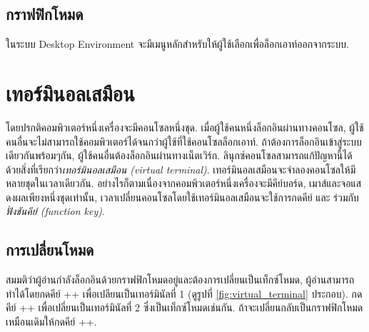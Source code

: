 \begin{thwbr}
\subsection{กราฟฟิกโหมด}
ในระบบ Desktop Environment จะมีเมนูหลักสำหรับให้ผู้ใช้เลือกเพื่อล็อกเอาท์ออกจากระบบ.


\section{เทอร์มินอลเสมือน}
โดยปรกติคอมพิวเตอร์หนึ่งเครื่องจะมีคอนโซลหนึ่งชุด. เมื่อผู้ใช้คนหนึ่งล็อกอินผ่านทางคอนโซล, ผู้ใช้คนอื่นจะไม่สามารถใช้คอมพิวเตอร์ได้จนกว่าผู้ใช้ที่ใช้คอนโซลล็อกเอาท์. ถ้าต้องการล็อกอินเข้าสู่ระบบเดียวกันพร้อมๆกัน, ผู้ใช้คนอื่นต้องล็อกอินผ่านทางเน็ตเวิร์ก. ลินุกซ์คอนโซลสามารถแก้ปัญหานี้ได้ด้วยสิ่งที่เรียกว่า\emph{เทอร์มินอลเสมือน (virtual terminal)}. %
%
เทอร์มินอลเสมือนจะจำลองคอนโซลให้มีหลายชุดในเวลาเดียวกัน. อย่างไรก็ตามเนื่องจากคอมพิวเตอร์หนึ่งเครื่องจะมีคีย์บอร์ด, เมาส์และจอแสดงผลเพียงหนึ่งชุดเท่านั้น, เวลาเปลี่ยนคอนโซลโดยใช้เทอร์มินอลเสมือนจะใช้การกดคีย์  และ  ร่วมกับ\emph{ฟั่งชันคีย์ (function key)}. 

\begin{figure}[!htb]
\end{figure}

\subsection{การเปลี่ยนโหมด}
สมมติว่าผู้อ่านกำลังล็อกอินด้วยกราฟฟิกโหมดอยู่และต้องการเปลี่ยนเป็นเท็กซ์โหมด, ผู้อ่านสามารถทำได้โดยกดคีย์ ++ เพื่อเปลียนเป็นเทอร์มินัลที่ 1 (ดูรูปที่ \ref{fig:virtual_terminal} ประกอบ). กดคีย์ ++ เพื่อเปลี่ยนเป็นเทอร์มินัลที่ 2 ซึ่งเป็นเท็กซ์โหมดเช่นกัน. ถ้าจะเปลี่ยนกลับเป็นกราฟฟิกโหมดเหมือนเดิมให้กดคีย์ ++. 


\end{thwbr}
